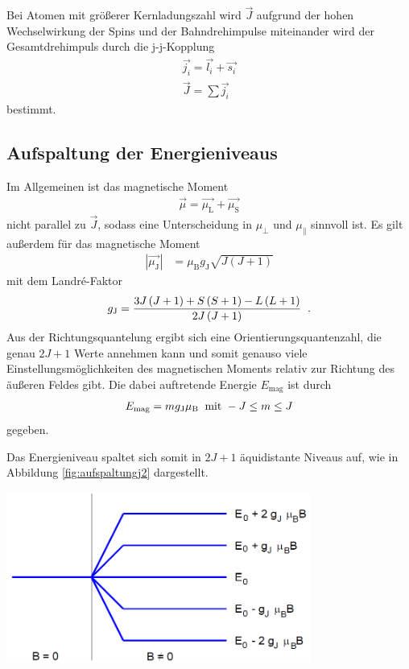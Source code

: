 \documentclass[captions=tableheading]{scrartcl}
\newcommand{\indx}[1]{\text{#1}}
\begin{document}
Bei Atomen mit größerer Kernladungszahl wird $\vec{J}$ aufgrund der hohen Wechselwirkung der Spins und der Bahndrehimpulse miteinander wird der Gesamtdrehimpuls durch die j-j-Kopplung
\begin{align}
\vec{j_i}=\vec{l_i}+\vec{s_i} \\
\vec{J}=\sum \vec{j_i}
\end{align}
bestimmt.
\subsection{Aufspaltung der Energieniveaus}
Im Allgemeinen ist das magnetische Moment
\begin{align}
\vec{\mu}=\vec{\mu_\indx{L}}+\vec{\mu_\indx{S}}
\end{align}
nicht parallel zu $\vec{J}$, sodass eine Unterscheidung in $\mu_{\perp}$ und $\mu_{\parallel}$ sinnvoll ist.
Es gilt außerdem für das magnetische Moment
\begin{align}
\left| \vec{\mu_\indx{J}} \right| &=\mu_\indx{B}g_\indx{J} \sqrt{J\left(J+1\right)}
\end{align}
mit dem Landr\'{e}-Faktor
\begin{align}
g_\indx{J}=\frac{3J\left(J+1\right)+S\left(S+1\right)-L\left(L+1\right)}{2J\left(J+1\right)}\hspace{0.2cm}\text{.}
\end{align}
Aus der Richtungsquantelung ergibt sich eine Orientierungsquantenzahl, die genau $2J+1$ Werte annehmen kann und somit genauso viele Einstellungsmöglichkeiten des magnetischen Moments relativ zur Richtung des äußeren Feldes gibt.
Die dabei auftretende Energie $E_\indx{mag}$ ist durch
\begin{align}
E_\indx{mag}=mg_\indx{J}\mu_\indx{B}\hspace{0.2cm}\text{mit }-J\le m \le J 
\end{align}
gegeben.

Das Energieniveau spaltet sich somit in $2J+1$ äquidistante Niveaus auf, wie in Abbildung \ref{fig:aufspaltungj2} dargestellt.

\begin{center}
	\includegraphics[width=10cm]{images/aufspaltungj2.png}
	\label{fig:aufspaltungj2}
\end{center}
\end{document}

